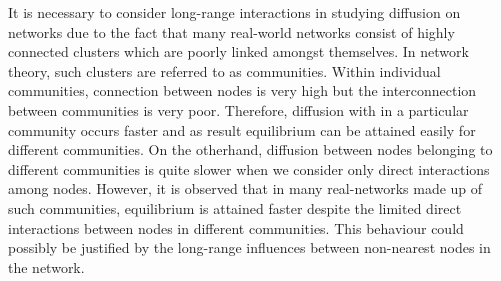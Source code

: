 \documentclass[10pt,a4paper]{article}
\theoremstyle{plain}
\theoremstyle{definition}
\begin{document}
        It is necessary to consider long-range interactions in studying diffusion on networks due to the fact that many real-world networks consist of highly connected clusters which are poorly linked amongst themselves. In network theory, such clusters are referred to as communities. Within individual communities, connection between nodes is very high but the interconnection between communities is very poor. Therefore, diffusion with in a particular community occurs faster and as result equilibrium can be attained easily for different communities. On the otherhand, diffusion between nodes belonging to different communities is quite slower when we consider only direct interactions among nodes. However, it is observed that in many real-networks made up of such communities, equilibrium is attained faster despite the limited direct interactions between nodes in different communities. This behaviour could possibly be justified by the long-range influences between non-nearest nodes in the network.
        
%        
%        
%        
        
\end{document}

